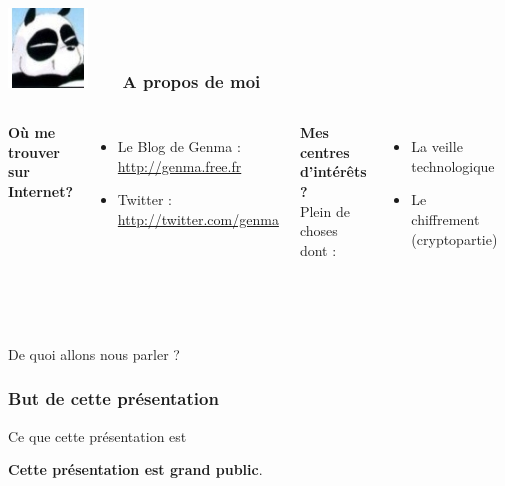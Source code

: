 \documentclass{beamer}
\begin{document}
\begin{frame}
\frametitle{\includegraphics[scale=0.4]{./images/Genma.jpg} \ \ \  A propos de moi  }
\begin{columns}[c] 

\textbf{Où me trouver sur Internet?}
\begin{itemize}
\item Le Blog de Genma : \url{http://genma.free.fr}
\item Twitter : \url{http://twitter.com/genma}
\end{itemize}

\textbf{Mes centres d'intérêts ?}
\\ Plein de choses dont :
\begin{itemize}
\item La veille technologique
\item Le chiffrement (cryptopartie)
\end{itemize}

\includegraphics[width=5cm,height=5cm]{./images/blog.png} 
\end{columns}
\end{frame}


\begin{frame}
\begin{center}
\Huge{De quoi allons nous parler ?}
\end{center}
\end{frame}


\begin{frame}
\frametitle{But de cette présentation}

\begin{block}{Ce que cette présentation est}
\begin{itemize}
\end{itemize}
 \textbf{Cette présentation est grand public}.
\end{block}
\end{frame}
\end{document}
